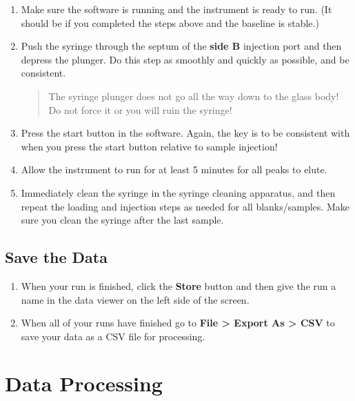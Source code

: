 \documentclass[]{tufte-book}
\providecommand{\tightlist}{%
  \setlength{\itemsep}{0pt}\setlength{\parskip}{0pt}}
\begin{document}
\begin{enumerate}
\def\labelenumi{\arabic{enumi}.}
\item
  Make sure the software is running and the instrument is ready to run. (It should be if you completed the steps above and the baseline is stable.)
\item
  Push the syringe through the septum of the \textbf{side B} injection port and then depress the plunger. Do this step as smoothly and quickly as possible, and be consistent.

  \begin{quote}
  The syringe plunger does not go all the way down to the glass body! Do not force it or you will ruin the syringe!
  \end{quote}
\item
  Press the start button in the software. Again, the key is to be consistent with when you press the start button relative to sample injection!
\item
  Allow the instrument to run for at least 5 minutes for all peaks to elute.
\item
  Immediately clean the syringe in the syringe cleaning apparatus, and then repeat the loading and injection steps as needed for all blanks/samples. Make sure you clean the syringe after the last sample.
\end{enumerate}

\hypertarget{save-the-data}{%
\subsection{Save the Data}\label{save-the-data}}

\begin{enumerate}
\def\labelenumi{\arabic{enumi}.}
\tightlist
\item
  When your run is finished, click the \textbf{Store} button and then give the run a name in the data viewer on the left side of the screen.
\item
  When all of your runs have finished go to \textbf{File \textgreater{} Export As \textgreater{} CSV} to save your data as a CSV file for processing.
\end{enumerate}

\hypertarget{data-processing}{%
\section{Data Processing}\label{data-processing}}
\end{document}
